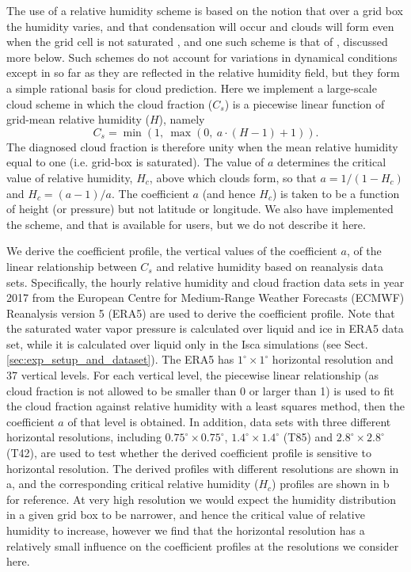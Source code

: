 The use of a relative humidity scheme is based on the notion that over a grid box the humidity varies, and that condensation will occur and clouds will form even when the grid cell is not saturated \citep{Tompkins2005, Quaas2012}, and one such scheme is that of \citet{Sundqvist1989}, discussed more below. Such schemes do not account for variations in dynamical conditions except in so far as they are reflected in the relative humidity field, but they form a simple rational basis for cloud prediction. Here we implement a large-scale cloud scheme in which the cloud fraction ($C_{s}$) is a piecewise linear function of grid-mean relative humidity ($H$), namely
\begin{equation}
	C_{s}=\min\left(1, ~\max \left(0, ~ a \cdot (H -1) + 1 \right)\right).
	\label{eq:linear_cf_rh} 
\end{equation}
The diagnosed cloud fraction is therefore unity when the mean relative humidity equal to one (i.e. grid-box is saturated). The value of $a$ determines the critical value of relative humidity, $H_c$, above which clouds form, so that $a=1/\left(1-H_{c}\right)$ and $H_c = (a -1)/a$. The coefficient $a$ (and hence $H_{c}$) is taken to be a function of height (or pressure) but not latitude or longitude. We also have implemented the \citet{Sundqvist1989} scheme, and that is available for users, but we do not describe it here. 

We derive the coefficient profile, the vertical values of the coefficient $a$, of the linear relationship between $C_s$ and relative humidity based on reanalysis data sets. Specifically, the hourly relative humidity and cloud fraction data sets in year 2017 from the European Centre for Medium-Range Weather Forecasts (ECMWF) Reanalysis version 5 (ERA5) \citep{era5} are used to derive the coefficient profile. Note that the saturated water vapor pressure is calculated over liquid and ice in ERA5 data set, while it is calculated over liquid only in the Isca simulations (see Sect.\ref{sec:exp_setup_and_dataset}). The ERA5 has $1^{\circ}\times 1^{\circ}$ horizontal resolution and 37 vertical levels. For each vertical level, the piecewise linear relationship (as cloud fraction is not allowed to be smaller than 0 or larger than 1) is used to fit the cloud fraction against relative humidity with a least squares method, then the coefficient $a$ of that level is obtained. In addition, data sets with three different horizontal resolutions, including $0.75^{\circ}\times 0.75^{\circ}$, $1.4^{\circ}\times 1.4^{\circ}$ (T85) and $2.8^{\circ}\times 2.8^{\circ}$ (T42), are used to test whether the derived coefficient profile is sensitive to horizontal resolution. The derived profiles with different resolutions are shown in a, and the corresponding critical relative humidity ($H_c$) profiles are shown in b for reference. At very high resolution we would expect the humidity distribution in a given grid box to be narrower, and hence the critical value of relative humidity to increase, however we find that the horizontal resolution has a relatively small influence on the coefficient profiles at the resolutions we consider here. 

